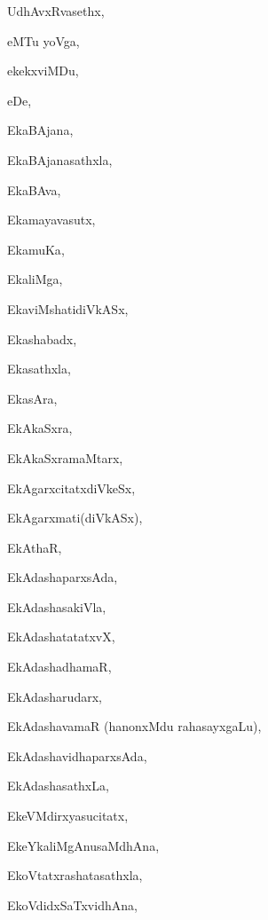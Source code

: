 \begin{multicols}{2}
{UdhAvxRvasethx}, \pageref{UdhAvxRvasethx}

{eMTu yoVga}, \pageref{eMTu yoVga}

{ekekxviMDu}, \pageref{ekekxviMDu}

{eDe}, \pageref{eDe}

{EkaBAjana}, \pageref{EkaBAjana}

{EkaBAjanasathxla}, \pageref{EkaBAjanasathxla}

{EkaBAva}, \pageref{EkaBAva}

{Ekamayavasutx}, \pageref{Ekamayavasutx}

{EkamuKa}, \pageref{EkamuKa}

{EkaliMga}, \pageref{EkaliMga}

{EkaviMshatidiVkASx}, \pageref{EkaviMshatidiVkASx}

{Ekashabadx}, \pageref{Ekashabadx}

{Ekasathxla}, \pageref{Ekasathxla}

{EkasAra}, \pageref{EkasAra}

{EkAkaSxra}, \pageref{EkAkaSxra}

{EkAkaSxramaMtarx}, \pageref{EkAkaSxramaMtarx}

{EkAgarxcitatxdiVkeSx}, \pageref{EkAgarxcitatxdiVkeSx}

{EkAgarxmati(diVkASx)}, \pageref{EkAgarxmati(diVkASx)}

{EkAthaR}, \pageref{EkAthaR}

{EkAdashaparxsAda}, \pageref{EkAdashaparxsAda}

{EkAdashasakiVla}, \pageref{EkAdashasakiVla}

{EkAdashatatatxvX}, \pageref{EkAdashatatatxvX}

{EkAdashadhamaR}, \pageref{EkAdashadhamaR}

{EkAdasharudarx}, \pageref{EkAdasharudarx}

{EkAdashavamaR (hanonxMdu rahasayxgaLu)}, \pageref{EkAdashavamaR (hanonxMdu rahasayxgaLu)}

{EkAdashavidhaparxsAda}, \pageref{EkAdashavidhaparxsAda}

{EkAdashasathxLa}, \pageref{EkAdashasathxLa}

{EkeVMdirxyasucitatx}, \pageref{EkeVMdirxyasucitatx}

{EkeYkaliMgAnusaMdhAna}, \pageref{EkeYkaliMgAnusaMdhAna}

{EkoVtatxrashatasathxla}, \pageref{EkoVtatxrashatasathxla}

{EkoVdidxSaTxvidhAna}, \pageref{EkoVdidxSaTxvidhAna}


\end{multicols}
